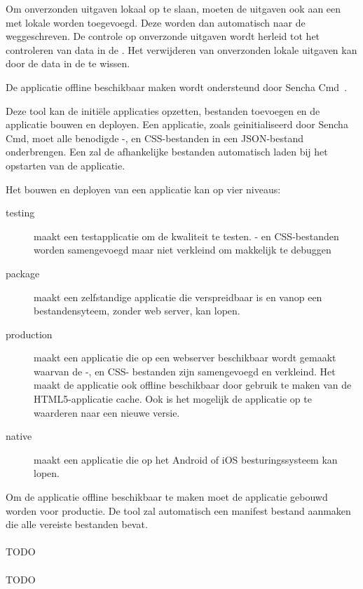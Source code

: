 Om onverzonden uitgaven lokaal op te slaan, moeten de uitgaven ook aan een  met lokale  worden toegevoegd.
Deze worden dan automatisch naar de  weggeschreven.
De controle op onverzonde uitgaven wordt herleid tot het controleren van data in de .
Het verwijderen van onverzonden lokale uitgaven kan door de data in de  te wissen.

De applicatie offline beschikbaar maken wordt ondersteund door Sencha Cmd~\cite{Sencha2012}.

Deze tool kan de initiële applicaties opzetten,  bestanden toevoegen en de applicatie bouwen en deployen.
Een applicatie,  zoals geinitialiseerd door Sencha Cmd,  moet alle benodigde \js-, en CSS-bestanden in een JSON-bestand onderbrengen.
Een  zal de afhankelijke bestanden automatisch laden bij het opstarten van de applicatie.

Het bouwen en deployen van een applicatie kan op vier niveaus:
\begin{description}
  \item [testing] maakt een testapplicatie om de kwaliteit te testen.  \js- en CSS-bestanden worden samengevoegd maar niet verkleind om makkelijk te debuggen
  \item [package] maakt een zelfstandige applicatie die verspreidbaar is en vanop een bestandensyteem,  zonder web server,  kan lopen.
  \item [production] maakt een applicatie die op een webserver beschikbaar wordt gemaakt waarvan de \js-, en CSS- bestanden zijn samengevoegd en verkleind.  Het maakt de applicatie ook offline beschikbaar door gebruik te maken van de HTML5-applicatie cache.  Ook is het mogelijk de applicatie op te waarderen naar een nieuwe versie.
  \item [native] maakt een  applicatie die op het Android of iOS besturingssysteem kan lopen.
\end{description}
Om de applicatie offline beschikbaar te maken moet de applicatie gebouwd worden voor productie.
De tool zal automatisch een manifest bestand aanmaken die alle vereiste bestanden bevat.

\paragraph{\kendo}
TODO

\paragraph{\lungo}
TODO

